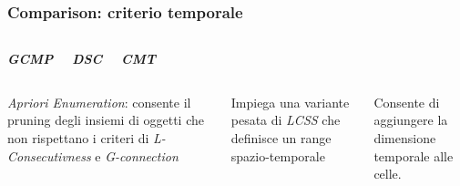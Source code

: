 \documentclass{beamer}
\begin{document}
\begin{frame}
	\frametitle{Comparison: criterio temporale}
	\begin{columns}
		
		\begin{center}
			\textbf{\textit{\huge{GCMP}}}
			
		\end{center}
		
		\begin{center}
			\textbf{\textit{\huge{DSC}}}
			
		\end{center}
		
		\begin{center}
			\textbf{\textit{\huge{CMT}}}
			
		\end{center}
	\end{columns}
	\begin{columns}
		
		\column{.3\columnwidth}
		
		\textit{Apriori Enumeration}: consente il pruning degli insiemi di oggetti
		che non rispettano i criteri di \textit{L-Consecutivness} e \textit{G-connection}
		
		
		\column{.3\textwidth}
		
		Impiega una variante pesata di \textit{LCSS} che definisce un range spazio-temporale
		
		\column{.3\textwidth}
		
		Consente di aggiungere la dimensione temporale alle celle.
		
	\end{columns}
\end{frame}    
\end{document}
